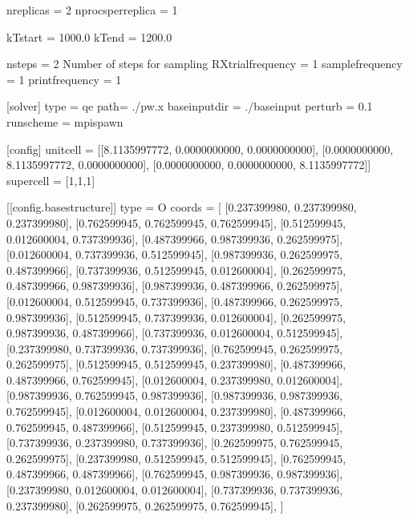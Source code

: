 \documentclass[letterpaper,10pt,dvipdfmx]{sphinxmanual}
\begin{document}
\begin{sphinxVerbatim}[commandchars=\\\{\}]
[replica]
nreplicas = 2
nprocs\PYGZus{}per\PYGZus{}replica = 1

kTstart = 1000.0
kTend = 1200.0

nsteps = 2  \PYGZsh{} Number of steps for sampling
RXtrial\PYGZus{}frequency = 1
sample\PYGZus{}frequency = 1
print\PYGZus{}frequency = 1

[solver]
type = \PYGZsq{}qe\PYGZsq{}
path= \PYGZsq{}./pw.x\PYGZsq{}
base\PYGZus{}input\PYGZus{}dir = \PYGZsq{}./baseinput\PYGZsq{}
perturb = 0.1
run\PYGZus{}scheme = \PYGZsq{}mpi\PYGZus{}spawn\PYGZsq{}

[config]
unitcell = [[8.1135997772, 0.0000000000, 0.0000000000],
            [0.0000000000, 8.1135997772, 0.0000000000],
            [0.0000000000, 0.0000000000, 8.1135997772]]
supercell = [1,1,1]

[[config.base\PYGZus{}structure]]
type = \PYGZdq{}O\PYGZdq{}
coords = [
     [0.237399980, 0.237399980, 0.237399980],
     [0.762599945, 0.762599945, 0.762599945],
     [0.512599945, 0.012600004, 0.737399936],
     [0.487399966, 0.987399936, 0.262599975],
     [0.012600004, 0.737399936, 0.512599945],
     [0.987399936, 0.262599975, 0.487399966],
     [0.737399936, 0.512599945, 0.012600004],
     [0.262599975, 0.487399966, 0.987399936],
     [0.987399936, 0.487399966, 0.262599975],
     [0.012600004, 0.512599945, 0.737399936],
     [0.487399966, 0.262599975, 0.987399936],
     [0.512599945, 0.737399936, 0.012600004],
     [0.262599975, 0.987399936, 0.487399966],
     [0.737399936, 0.012600004, 0.512599945],
     [0.237399980, 0.737399936, 0.737399936],
     [0.762599945, 0.262599975, 0.262599975],
     [0.512599945, 0.512599945, 0.237399980],
     [0.487399966, 0.487399966, 0.762599945],
     [0.012600004, 0.237399980, 0.012600004],
     [0.987399936, 0.762599945, 0.987399936],
     [0.987399936, 0.987399936, 0.762599945],
     [0.012600004, 0.012600004, 0.237399980],
     [0.487399966, 0.762599945, 0.487399966],
     [0.512599945, 0.237399980, 0.512599945],
     [0.737399936, 0.237399980, 0.737399936],
     [0.262599975, 0.762599945, 0.262599975],
     [0.237399980, 0.512599945, 0.512599945],
     [0.762599945, 0.487399966, 0.487399966],
     [0.762599945, 0.987399936, 0.987399936],
     [0.237399980, 0.012600004, 0.012600004],
     [0.737399936, 0.737399936, 0.237399980],
     [0.262599975, 0.262599975, 0.762599945],
     ]


\end{sphinxVerbatim}
\end{document}

